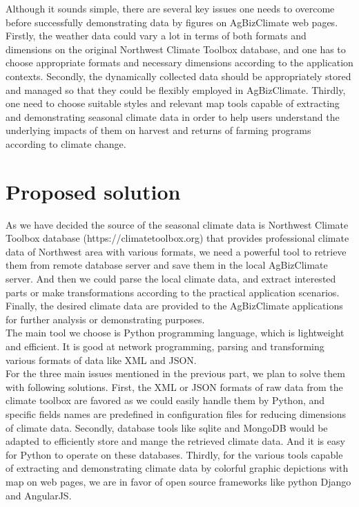 \documentclass[letterpaper,10pt]{article}
\begin{document}
    Although it sounds simple, there are several key issues one needs to overcome before successfully demonstrating data by figures on AgBizClimate web pages. Firstly, the weather data could vary a lot in terms of both formats and dimensions on the original Northwest Climate Toolbox database, and one has to choose appropriate formats and necessary dimensions according to the application contexts. Secondly, the dynamically collected data should be appropriately stored and managed so that they could be flexibly employed in AgBizClimate. Thirdly, one need to choose suitable styles and relevant map tools capable of extracting and demonstrating seasonal climate data in order to help users understand the underlying impacts of them on harvest and returns of farming programs according to climate change.

	  \section*{Proposed solution}
   As we have decided the source of the seasonal climate data is Northwest Climate Toolbox database (https://climatetoolbox.org) that provides professional climate data of Northwest area with various formats, we need a powerful tool to retrieve them from remote database server and save them in the local AgBizClimate server. And then we could parse the local climate data, and extract interested parts or make transformations according to the practical application scenarios. Finally, the desired climate data are provided to the AgBizClimate applications for further analysis or demonstrating purposes.\\
   
   The main tool we choose is Python programming language, which is lightweight and efficient. It is good at network programming, parsing and transforming various formats of data like XML and JSON.\\
   
   For the three main issues mentioned in the previous part, we plan to solve them with following solutions. First, the XML or JSON formats of raw data from the climate toolbox are favored as we could easily handle them by Python, and specific fields names are predefined in configuration files for reducing dimensions of climate data. Secondly, database tools like sqlite and MongoDB would be adapted to efficiently store and mange the retrieved climate data. And it is easy for Python to operate on these databases. Thirdly, for the various tools capable of extracting and demonstrating climate data by colorful graphic depictions with map on web pages, we are in favor of open source frameworks like python Django and AngularJS.
\end{document}
